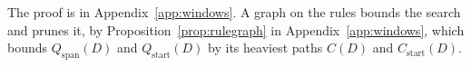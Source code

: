 \documentclass[11pt,a4paper]{article}
\theoremstyle{definition}
\theoremstyle{plain}
\begin{document}
The proof is in Appendix~\ref{app:windows}. A graph on the rules bounds the search and prunes it, by
Proposition~\ref{prop:rulegraph} in Appendix~\ref{app:windows}, which bounds \(Q_{\mathrm{span}}(D)\) and
\(Q_{\mathrm{start}}(D)\) by its heaviest paths \(C(D)\) and \(C_{\mathrm{start}}(D)\).
\end{document}
